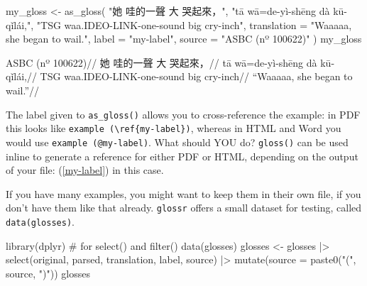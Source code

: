 \documentclass[
  letterpaper,
  DIV=11,
  numbers=noendperiod]{scrartcl}
\newenvironment{Shaded}{\begin{snugshade}}{\end{snugshade}}
\newcommand{\AttributeTok}[1]{\textcolor[rgb]{0.40,0.45,0.13}{#1}}
\newcommand{\CommentTok}[1]{\textcolor[rgb]{0.37,0.37,0.37}{#1}}
\newcommand{\FunctionTok}[1]{\textcolor[rgb]{0.28,0.35,0.67}{#1}}
\newcommand{\NormalTok}[1]{\textcolor[rgb]{0.00,0.23,0.31}{#1}}
\newcommand{\OtherTok}[1]{\textcolor[rgb]{0.00,0.23,0.31}{#1}}
\newcommand{\SpecialCharTok}[1]{\textcolor[rgb]{0.37,0.37,0.37}{#1}}
\newcommand{\StringTok}[1]{\textcolor[rgb]{0.13,0.47,0.30}{#1}}
\begin{document}
\begin{Shaded}
\begin{Highlighting}[]
\NormalTok{my\_gloss }\OtherTok{\textless{}{-}} \FunctionTok{as\_gloss}\NormalTok{(}
  \StringTok{"她 哇的一聲 大 哭起來，"}\NormalTok{,}
  \StringTok{"tā wā=de{-}yì{-}shēng dà kū{-}qǐlái,"}\NormalTok{,}
  \StringTok{"TSG waa.IDEO{-}LINK{-}one{-}sound big cry{-}inch"}\NormalTok{,}
  \AttributeTok{translation =} \StringTok{"Waaaaa, she began to wail."}\NormalTok{,}
  \AttributeTok{label =} \StringTok{"my{-}label"}\NormalTok{,}
  \AttributeTok{source =} \StringTok{"ASBC (nº 100622)"}
\NormalTok{)}
\NormalTok{my\_gloss}
\end{Highlighting}
\end{Shaded}

\ex\label{my-label}
\begingl \glpreamble ASBC (nº 100622)// \gla 她 哇的一聲 大 哭起來，//
\glb tā wā=de-yì-shēng dà kū-qǐlái,// \glc TSG waa.IDEO-LINK-one-sound
big cry-inch// \glft ``Waaaaa, she began to wail.''// \endgl \xe 

The label given to \texttt{as\_gloss()} allows you to cross-reference
the example: in PDF this looks like
\texttt{example\ (\textbackslash{}ref\{my-label\})}, whereas in HTML and
Word you would use \texttt{example\ (@my-label)}. What should YOU do?
\texttt{gloss()} can be used inline to generate a reference for either
PDF or HTML, depending on the output of your file: (\ref{my-label}) in
this case.

If you have many examples, you might want to keep them in their own
file, if you don't have them like that already. \texttt{glossr} offers a
small dataset for testing, called \texttt{data(glosses)}.

\begin{Shaded}
\begin{Highlighting}[]
\FunctionTok{library}\NormalTok{(dplyr) }\CommentTok{\# for select() and filter()}
\FunctionTok{data}\NormalTok{(glosses)}
\NormalTok{glosses }\OtherTok{\textless{}{-}}\NormalTok{ glosses }\SpecialCharTok{|\textgreater{}} 
  \FunctionTok{select}\NormalTok{(original, parsed, translation, label, source) }\SpecialCharTok{|\textgreater{}} 
  \FunctionTok{mutate}\NormalTok{(}\AttributeTok{source =} \FunctionTok{paste0}\NormalTok{(}\StringTok{"("}\NormalTok{, source, }\StringTok{")"}\NormalTok{))}
\NormalTok{glosses}
\end{Highlighting}
\end{Shaded}
\end{document}
